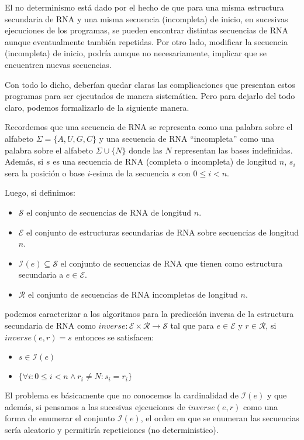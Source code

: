 El no determinismo est\'a dado por el hecho de que para una misma estructura
secundaria de \ac{RNA} y una misma secuencia (incompleta) de inicio, en
sucesivas ejecuciones de los programas, se pueden encontrar distintas secuencias
de \ac{RNA} aunque eventualmente tambi\'en repetidas. Por otro lado, modificar
la secuencia (incompleta) de inicio, podr\'ia aunque no necesariamente, implicar
que se encuentren nuevas secuencias.

Con todo lo dicho, deber\'ian quedar claras las complicaciones que presentan
estos programas para ser ejecutados de manera sistem\'atica. Pero para dejarlo
del todo claro, podemos formalizarlo de la siguiente manera.

Recordemos que una secuencia de \ac{RNA} se representa como una palabra sobre el
alfabeto $\Sigma = \{A,U,G,C\}$ y una secuencia de \ac{RNA} ``incompleta'' como
una palabra sobre el alfabeto $\Sigma \cup \{N\}$ donde las $N$ representan las
bases indefinidas. Adem\'as, si $s$ es una secuencia de \ac{RNA} (completa o
incompleta) de longitud $n$, $s_{i}$ sera la posici\'on o base $i$-esima de la
secuencia $s$ con $0 \leq i < n$.

Luego, si definimos:
\begin{itemize}
 \item $\mathcal{S}$ el conjunto de secuencias de \ac{RNA} de longitud $n$.
 \item $\mathcal{E}$ el conjunto de estructuras secundarias de \ac{RNA} sobre
secuencias de longitud $n$. 
 \item $\mathcal{I}(e) \subseteq \mathcal{S}$ el conjunto de secuencias de
\ac{RNA} que tienen como estructura secundaria a $e \in \mathcal{E}$.
 \item $\mathcal{R}$ el conjunto de secuencias de \ac{RNA} incompletas de
longitud $n$.
\end{itemize}

podemos caracterizar a los algoritmos para la predicci\'on inversa de la
estructura secundaria de \ac{RNA} como $inverse: \mathcal{E} \times \mathcal{R}
\rightarrow \mathcal{S}$ tal que para $e \in \mathcal{E}$ y $r \in
\mathcal{R}$, si $inverse(e,r) = s$ entonces se satisfacen:
\begin{itemize}
 \item $s \in \mathcal{I}(e)$
 \item $\{\forall i : 0 \leq i < n \land r_{i} \neq N : s_{i} = r_{i}\}$ 
\end{itemize}

El problema es b\'asicamente que no conocemos la cardinalidad de
$\mathcal{I}(e)$ y que adem\'as, si pensamos a las sucesivas ejecuciones de
$inverse(e,r)$ como una forma de enumerar el conjunto $\mathcal{I}(e)$, el orden
en que se enumeran las secuencias ser\'ia aleatorio y permitir\'ia repeticiones
(no deterministico).

